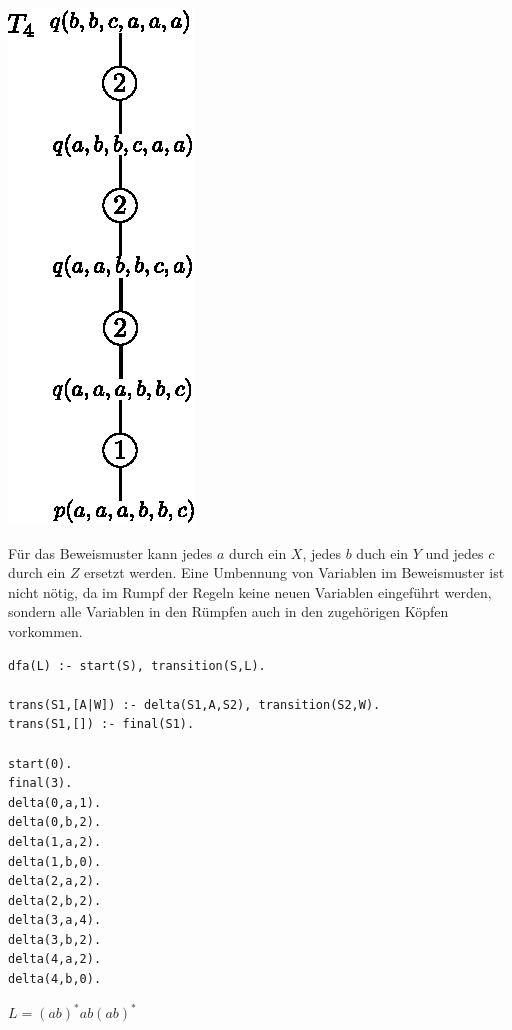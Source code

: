 \documentclass[12pt,a4paper]{amsart}
\begin{document}
\begin{aufgabe1}
\begin{center}
\includegraphics[]{t4.eps}
\end{center}
Für das Beweismuster kann jedes $a$ durch ein $X$, jedes $b$ duch ein $Y$ und jedes $c$ durch ein $Z$ ersetzt werden. Eine Umbennung von Variablen im Beweismuster
ist nicht nötig, da im Rumpf der Regeln keine neuen Variablen eingeführt werden, sondern alle Variablen in den Rümpfen auch in den zugehörigen Köpfen vorkommen.
\end{aufgabe1}


\begin{aufgabe1}
\begin{verbatim}
dfa(L) :- start(S), transition(S,L).

trans(S1,[A|W]) :- delta(S1,A,S2), transition(S2,W).  
trans(S1,[]) :- final(S1).

start(0).
final(3).
delta(0,a,1).   
delta(0,b,2).
delta(1,a,2).
delta(1,b,0).
delta(2,a,2).
delta(2,b,2).
delta(3,a,4).
delta(3,b,2).
delta(4,a,2).
delta(4,b,0).
\end{verbatim}
$L=(ab)^{\ast}ab(ab)^{\ast}$
\end{aufgabe1}
\end{document}
